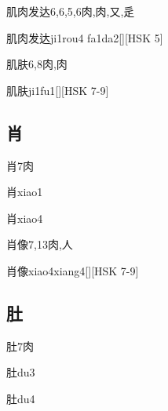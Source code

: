 \begin{Entry}{肌肉发达}{6,6,5,6}{⾁,⾁,⼜,⾡}
  \begin{Phonetics}{肌肉发达}{ji1rou4 fa1da2}[][HSK 5]
  \end{Phonetics}
\end{Entry}

\begin{Entry}{肌肤}{6,8}{⾁,⾁}
  \begin{Phonetics}{肌肤}{ji1fu1}[][HSK 7-9]
  \end{Phonetics}
\end{Entry}

\subsection*{肖}

\begin{Entry}{肖}{7}{⾁}
  \begin{Phonetics}{肖}{xiao1}
  \end{Phonetics}
  \begin{Phonetics}{肖}{xiao4}
  \end{Phonetics}
\end{Entry}

\begin{Entry}{肖像}{7,13}{⾁,⼈}
  \begin{Phonetics}{肖像}{xiao4xiang4}[][HSK 7-9]
  \end{Phonetics}
\end{Entry}

\subsection*{肚}

\begin{Entry}{肚}{7}{⾁}
  \begin{Phonetics}{肚}{du3}
  \end{Phonetics}
  \begin{Phonetics}{肚}{du4}
  \end{Phonetics}
\end{Entry}

